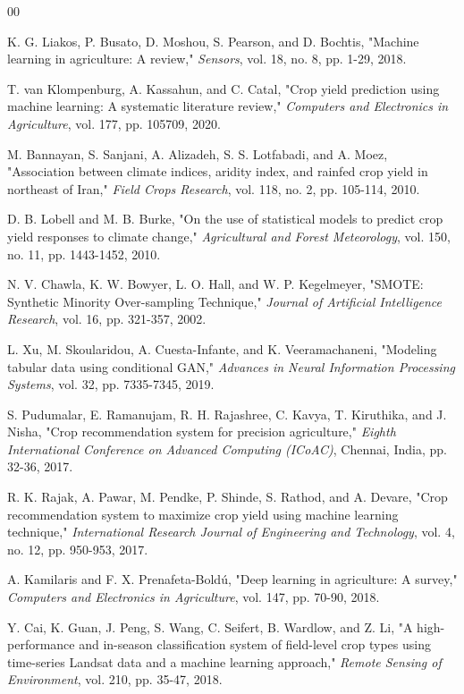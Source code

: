 \documentclass[10pt,twocolumn]{article}
\begin{document}
\begin{thebibliography}{00}

 K. G. Liakos, P. Busato, D. Moshou, S. Pearson, and D. Bochtis, "Machine learning in agriculture: A review," \textit{Sensors}, vol. 18, no. 8, pp. 1-29, 2018.

 T. van Klompenburg, A. Kassahun, and C. Catal, "Crop yield prediction using machine learning: A systematic literature review," \textit{Computers and Electronics in Agriculture}, vol. 177, pp. 105709, 2020.

 M. Bannayan, S. Sanjani, A. Alizadeh, S. S. Lotfabadi, and A. Moez, "Association between climate indices, aridity index, and rainfed crop yield in northeast of Iran," \textit{Field Crops Research}, vol. 118, no. 2, pp. 105-114, 2010.

 D. B. Lobell and M. B. Burke, "On the use of statistical models to predict crop yield responses to climate change," \textit{Agricultural and Forest Meteorology}, vol. 150, no. 11, pp. 1443-1452, 2010.

 N. V. Chawla, K. W. Bowyer, L. O. Hall, and W. P. Kegelmeyer, "SMOTE: Synthetic Minority Over-sampling Technique," \textit{Journal of Artificial Intelligence Research}, vol. 16, pp. 321-357, 2002.

 L. Xu, M. Skoularidou, A. Cuesta-Infante, and K. Veeramachaneni, "Modeling tabular data using conditional GAN," \textit{Advances in Neural Information Processing Systems}, vol. 32, pp. 7335-7345, 2019.

 S. Pudumalar, E. Ramanujam, R. H. Rajashree, C. Kavya, T. Kiruthika, and J. Nisha, "Crop recommendation system for precision agriculture," \textit{Eighth International Conference on Advanced Computing (ICoAC)}, Chennai, India, pp. 32-36, 2017.

 R. K. Rajak, A. Pawar, M. Pendke, P. Shinde, S. Rathod, and A. Devare, "Crop recommendation system to maximize crop yield using machine learning technique," \textit{International Research Journal of Engineering and Technology}, vol. 4, no. 12, pp. 950-953, 2017.

 A. Kamilaris and F. X. Prenafeta-Boldú, "Deep learning in agriculture: A survey," \textit{Computers and Electronics in Agriculture}, vol. 147, pp. 70-90, 2018.

 Y. Cai, K. Guan, J. Peng, S. Wang, C. Seifert, B. Wardlow, and Z. Li, "A high-performance and in-season classification system of field-level crop types using time-series Landsat data and a machine learning approach," \textit{Remote Sensing of Environment}, vol. 210, pp. 35-47, 2018.


\end{thebibliography}
\end{document}
